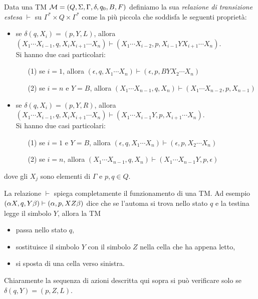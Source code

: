 \documentclass[runningheads,a4paper]{llncs}
\begin{document}
\begin{definition}\label{def:trans-est3}
Data una TM $\mathcal{M} = (Q,\Sigma,\Gamma,\delta,q_0,B,F)$ definiamo la sua \emph{relazione di transizione estesa} $\vdash$ su $\Gamma^* \times Q \times \Gamma^*$ come la pi\`{u} piccola che soddisfa le seguenti propriet\`{a}:
\begin{itemize}
\item se $\delta(q,X_i)=(p,Y,L)$, allora $(X_1\cdots X_{i-1},q,X_{i}X_{i+1}\cdots X_{n}) \vdash (X_1\cdots X_{i-2},p,X_{i-1}YX_{i+1}\cdots X_{n})$.\\ Si hanno due casi particolari:
\begin{itemize}
\item[(1)] se $i=1$, allora $(\epsilon,q,X_1\cdots X_{n}) \vdash (\epsilon,p,BYX_{2}\cdots X_{n})$
\item[(2)] se $i=n$ e $Y=B$, allora $(X_1\cdots X_{n-1},q,X_n) \vdash (X_{1}\cdots X_{n-2},p,X_{n-1})$
\end{itemize}
\item se $\delta(q,X_i)=(p,Y,R)$, allora $(X_1\cdots X_{i-1},q,X_{i}X_{i+1}\cdots X_{n}) \vdash (X_1\cdots X_{i-1}Y,p,X_{i+1}\cdots X_{n})$.\\ Si hanno due casi particolari:
\begin{itemize}
\item[(1)] se $i=1$ e $Y=B$, allora $(\epsilon,q,X_1\cdots X_n) \vdash (\epsilon,p,X_{2}\cdots X_{n})$
\item[(2)] se $i=n$, allora $(X_1\cdots X_{n-1},q,X_{n}) \vdash (X_1\cdots X_{n-1}Y,p,\epsilon)$
\end{itemize}
\end{itemize}
dove gli $X_j$ sono elementi di $\Gamma$ e $p,q \in Q$.
\end{definition}

La relazione $\vdash$ spiega completamente il funzionamento di una TM. Ad esempio $(\alpha X,q,Y\beta) \vdash (\alpha,p,XZ\beta)$ dice che se l'automa si trova nello stato $q$ e la testina legge il simbolo $Y$, allora la TM
\begin{itemize}
\item passa nello stato $q$,
\item sostituisce il simbolo $Y$ con il simbolo $Z$ nella cella che ha appena letto,
\item si sposta di una cella verso sinistra.
\end{itemize}
Chiaramente la sequenza di azioni descritta qui sopra si pu\`{o} verificare solo se $\delta(q,Y) = (p,Z,L)$.
\end{document}
